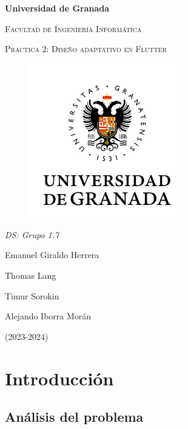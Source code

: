 \documentclass{article}
\begin{document}
    \begin{titlepage}
        \centering
        {\bfseries\LARGE Universidad de Granada\par}
        \vspace{1cm}
        {\scshape\Large Facultad de Ingeniería Informática \par}
        \vspace{2cm}
        {\scshape\Huge Practica 2: Diseño adaptativo en Flutter \par}
        \begin{figure}[h]
                \centering
                \includegraphics[width=0.6\textwidth]{logo_UGR.jpg}
                \label{fig:portada}
            \end{figure}
        {\itshape\Large DS: Grupo 1.7\par}
        \vfill
            {\Large  Emanuel Giraldo Herrera\par}
            {\Large  Thomas Lang \par}
            {\Large  Timur Sorokin \par}
            {\Large  Alejando Iborra Morán \par}
        \vfill
        {\Large (2023-2024) \par}
    \end{titlepage}

\tableofcontents

\newpage
\section{Introducción}
\subsection{Análisis del problema}
 
\end{document}
